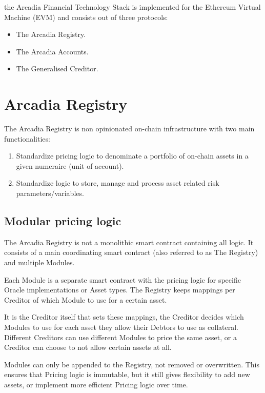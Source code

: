 \documentclass[sigconf,nonacm]{acmart}
\begin{document}
the Arcadia Financial Technology Stack is implemented for the Ethereum Virtual Machine (EVM) and consists out of three protocols:
\begin{itemize}
    \item The Arcadia Registry.
    \item The Arcadia Accounts.
    \item The Generalised Creditor.
\end{itemize}

\section{Arcadia Registry}
\label{sec:arcadia-registry}

The Arcadia Registry is non opinionated on-chain infrastructure with two main functionalities:
\begin{enumerate}
    \item Standardize pricing logic to denominate a portfolio of on-chain assets in a given numeraire (unit of account).
    \item Standardize logic to store, manage and process asset related risk parameters/variables.
\end{enumerate}

\subsection{Modular pricing logic}
\label{subsec:modular-pricing-logic}
The Arcadia Registry is not a monolithic smart contract containing all logic.
It consists of a main coordinating smart contract (also referred to as The Registry) and multiple Modules.

Each Module is a separate smart contract with the pricing logic for specific Oracle implementations or Asset types.
The Registry keeps mappings per Creditor of which Module to use for a certain asset.

It is the Creditor itself that sets these mappings, the Creditor decides which Modules to use for each asset they allow their Debtors to use as collateral.
Different Creditors can use different Modules to price the same asset, or a Creditor can choose to not allow certain assets at all.

Modules can only be appended to the Registry, not removed or overwritten.
This ensures that Pricing logic is immutable, but it still gives flexibility to add new assets, or implement more efficient Pricing logic over time.
\end{document}

